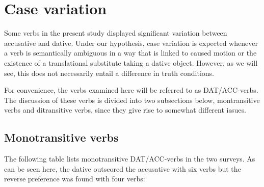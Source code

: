 \section{Case variation}  %

Some verbs in the present study displayed significant variation between accusative and dative. Under our hypothesis, case variation is expected whenever a verb is semantically ambiguous in a way that is linked to caused motion or the existence of a translational substitute taking a dative object. However, as we will see, this does not necessarily entail a difference in truth conditions.

For convenience, the verbs examined here will be referred to as DAT/ACC-verbs. The discussion of these verbs is divided into two subsections below, montransitive verbs and ditransitive verbs, since they give rise to somewhat different issues.

\subsection{Monotransitive verbs} %

The following table lists monotransitive DAT/ACC-verbs in the two surveys. As can be seen here, the dative outscored the accusative with six verbs but the reverse preference was found with four verbs: 

\tablefirsthead{}

